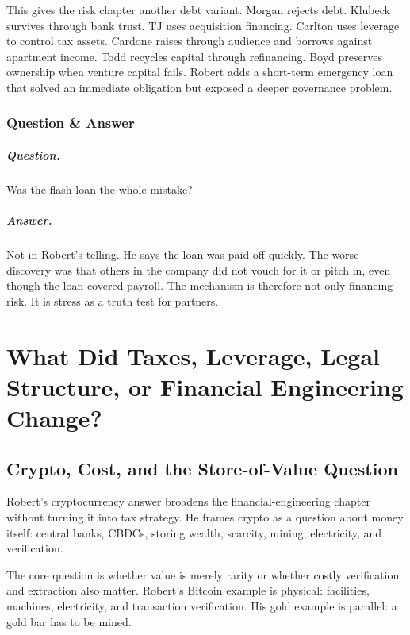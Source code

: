 \documentclass[11pt,oneside]{book}
\begin{document}
This gives the risk chapter another debt variant. Morgan rejects debt. Klubeck survives through bank trust. TJ uses acquisition financing. Carlton uses leverage to control tax assets. Cardone raises through audience and borrows against apartment income. Todd recycles capital through refinancing. Boyd preserves ownership when venture capital fails. Robert adds a short-term emergency loan that solved an immediate obligation but exposed a deeper governance problem.

\subsection{Question \& Answer}

\paragraph{Question.}
Was the flash loan the whole mistake?

\paragraph{Answer.}
Not in Robert's telling. He says the loan was paid off quickly. The worse discovery was that others in the company did not vouch for it or pitch in, even though the loan covered payroll. The mechanism is therefore not only financing risk. It is stress as a truth test for partners.

\chapter{What Did Taxes, Leverage, Legal Structure, or Financial Engineering Change?}

\section{Crypto, Cost, and the Store-of-Value Question}

Robert's cryptocurrency answer broadens the financial-engineering chapter without turning it into tax strategy. He frames crypto as a question about money itself: central banks, CBDCs, storing wealth, scarcity, mining, electricity, and verification.

The core question is whether value is merely rarity or whether costly verification and extraction also matter. Robert's Bitcoin example is physical: facilities, machines, electricity, and transaction verification. His gold example is parallel: a gold bar has to be mined.
\end{document}
